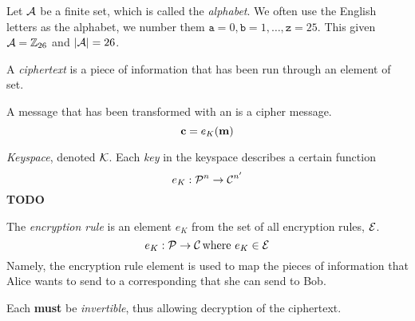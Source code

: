 \begin{definition}[Alphabet]\label{def:Alphabet}
  Let $\operatorname{\mathcal{A}}$ be a finite set, which is called the \emph{alphabet}.
  We often use the English letters as the alphabet, we number them $\mathtt{a} = 0, \mathtt{b} = 1, \ldots, \mathtt{z} = 25$.
  This given $\operatorname{\mathcal{A}} = \operatorname{\mathbb{Z}}_{26}$ and $\lvert \operatorname{\mathcal{A}} \rvert = 26$.
\end{definition}

\begin{definition}[Ciphertext]\label{def:Ciphertext}
  A \emph{ciphertext} is a piece of  information that has been run through an element of  set.

  A message that has been transformed with an  is a cipher message.
  \begin{equation}\label{eq:Ciphertext}
    \operatorname{\mathbf{c}} = e_{K} (\operatorname{\mathbf{m}})
  \end{equation}
\end{definition}

\begin{definition}[Keyspace]\label{def:Keyspace}
  \emph{Keyspace}, denoted $\operatorname{\mathcal{K}}$.
  Each \emph{key} in the keyspace describes a certain function
  \begin{equation}\label{eq:Keyspace}
    e_{K} : \operatorname{\mathcal{P}}^{n} \rightarrow \operatorname{\mathcal{C}}^{n'}
  \end{equation}
  \textbf{TODO}
\end{definition}

\begin{definition}\label{def:Encryption_Rule}
  The \emph{encryption rule} is an element $e_{K}$ from the set of all encryption rules, $\operatorname{\mathcal{E}}$.
  \begin{equation}\label{eq:Encryption_Rule}
    e_{K} : \operatorname{\mathcal{P}} \rightarrow \operatorname{\mathcal{C}} \text{where } e_{K} \in \operatorname{\mathcal{E}}
  \end{equation}
  Namely, the encryption rule element is used to map the  pieces of information that Alice wants to send to a corresponding  that she can send to Bob.

  \begin{remark}[Invertible]\label{rmk:Encryption_Rule_Invertible}
    Each  \textbf{must} be \emph{invertible}, thus allowing decryption of the ciphertext.
  \end{remark}
\end{definition}

